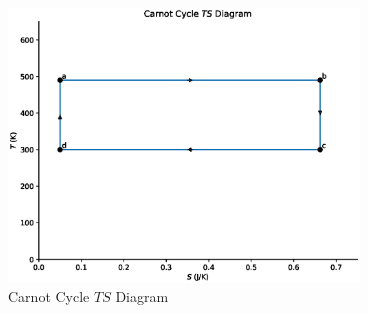 \documentclass[12pt]{iopart} %
\begin{document}
\begin{figure}[htbp]
  \begin{indented}
  \item[]\includegraphics[width=0.83\textwidth]{ts-diagram-carnot-cycle.eps}
  \end{indented}
  \caption{\label{fig:ts_diagram}
  Carnot Cycle $TS$ Diagram
  }
\end{figure}
\end{document}

